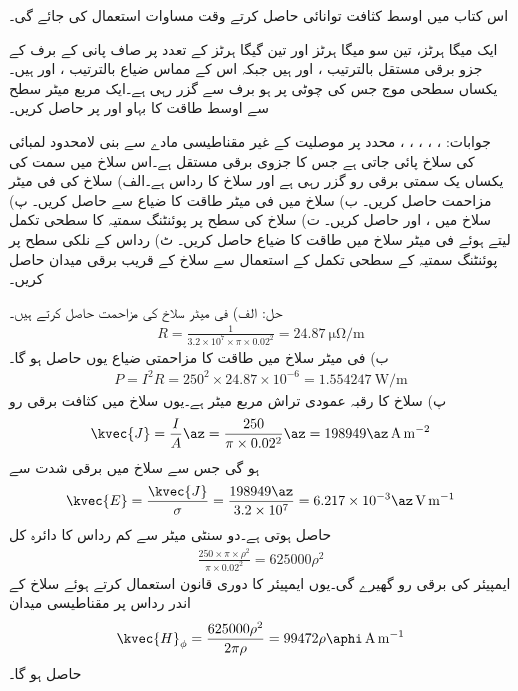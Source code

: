 اس کتاب میں اوسط کثافت توانائی حاصل کرتے  وقت مساوات  استعمال کی جائے گی۔

ایک میگا ہرٹز، تین سو میگا ہرٹز اور تین گیگا ہرٹز کے تعدد پر صاف پانی کے برف کے جزو برقی مستقل بالترتیب  ،  اور  ہیں جبکہ اس کے مماس ضیاع بالترتیب  ،   اور  ہیں۔ یکساں سطحی موج جس کی چوٹی  پر  ہو برف سے گزر رہی ہے۔ایک مربع میٹر سطح سے اوسط طاقت کا بہاو  اور  پر حاصل کریں۔

جوابات: ، ، ، ،  ،   
 محدد پر  موصلیت کے غیر مقناطیسی مادے سے بنی لامحدود لمبائی کی سلاخ پائی جاتی ہے جس کا جزوی برقی مستقل   ہے۔اس سلاخ میں  سمت  کی یکساں یک سمتی برقی رو گزر رہی ہے اور سلاخ کا رداس  ہے۔الف) سلاخ کی فی میٹر مزاحمت حاصل کریں۔ ب) سلاخ میں فی میٹر طاقت کا ضیاع  سے حاصل کریں۔ پ) سلاخ میں ،  اور  حاصل کریں۔ ت) سلاخ کی سطح پر پوئنٹنگ سمتیہ کا سطحی تکمل لیتے ہوئے فی میٹر سلاخ میں طاقت کا ضیاع حاصل کریں۔ ٹ) رداس  کے نلکی سطح پر پوئنٹنگ سمتیہ کے سطحی تکمل کے استعمال سے سلاخ کے قریب برقی میدان حاصل کریں۔

حل: الف) فی میٹر سلاخ کی مزاحمت حاصل کرتے ہیں۔ 
\begin{align*}
R=\frac{1}{3.2\times 10^7 \times \pi \times 0.02^2}=\SI{24.87}{\micro\ohm\per\meter}
\end{align*} 
ب) فی میٹر سلاخ میں طاقت کا مزاحمتی ضیاع یوں حاصل ہو گا۔
\begin{align*}
P=I^2 R=250^2 \times 24.87 \times 10^{-6}=\SI{1.554247}{\watt\per\meter}
\end{align*}
پ) سلاخ کا رقبہ عمودی تراش  مربع میٹر ہے۔یوں سلاخ میں کثافت برقی رو
\begin{align*}
\kvec{J}=\frac{I}{A} \az =\frac{250}{\pi \times 0.02^2} \az=198949 \az \, \si{\ampere\per\meter\squared}
\end{align*}
ہو گی جس سے سلاخ میں برقی شدت  سے 
\begin{align*}
\kvec{E}=\frac{\kvec{J}}{\sigma}=\frac{198949 \az}{3.2\times 10^7}=6.217\times 10^{-3} \az \, \si{\volt\per\meter}
\end{align*}
حاصل ہوتی ہے۔دو سنٹی میٹر سے کم رداس  کا دائرہ کل
\begin{align*}
\frac{250 \times \pi \times \rho^2}{\pi \times 0.02^2}=625000 \rho^2
\end{align*}
ایمپیئر کی برقی رو گھیرے گی۔یوں ایمپیئر کا دوری قانون استعمال کرتے ہوئے سلاخ کے اندر رداس  پر مقناطیسی میدان
\begin{align*}
\kvec{H}_{\phi}=\frac{625000 \rho^2}{2\pi \rho}=99472 \rho  \aphi \, \si{\ampere\per\meter}
\end{align*}
حاصل ہو گا۔

